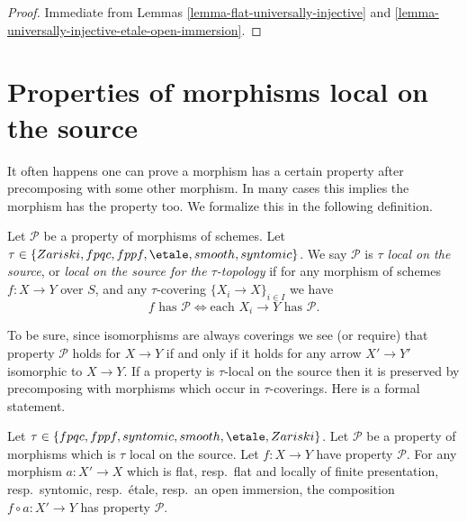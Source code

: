 \begin{proof}
Immediate from Lemmas \ref{lemma-flat-universally-injective} and
\ref{lemma-universally-injective-etale-open-immersion}.
\end{proof}
















\section{Properties of morphisms local on the source}
\label{section-properties-morphisms-local-source}

\noindent
It often happens one can prove a morphism has a certain property
after precomposing with some other morphism. In many cases this
implies the morphism has the property too. We formalize
this in the following definition.

\begin{definition}
\label{definition-property-morphisms-local-source}
Let $\mathcal{P}$ be a property of morphisms of schemes.
Let $\tau \in \{Zariski, \linebreak[0] fpqc, \linebreak[0] fppf, \linebreak[0]
\etale, \linebreak[0] smooth, \linebreak[0] syntomic\}$.
We say $\mathcal{P}$ is
{\it $\tau$ local on the source}, or
{\it local on the source for the $\tau$-topology} if for
any morphism of schemes $f : X \to Y$ over $S$, and any
$\tau$-covering $\{X_i \to X\}_{i \in I}$ we
have
$$
f \text{ has }\mathcal{P}
\Leftrightarrow
\text{each }X_i \to Y\text{ has }\mathcal{P}.
$$
\end{definition}

\noindent
To be sure, since isomorphisms are always coverings
we see (or require) that property $\mathcal{P}$ holds for $X \to Y$
if and only if it holds for any arrow $X' \to Y'$ isomorphic to $X \to Y$.
If a property is $\tau$-local on the source then it is preserved by
precomposing with morphisms which occur in $\tau$-coverings. Here
is a formal statement.

\begin{lemma}
\label{lemma-precompose-property-local-source}
Let $\tau \in \{fpqc, fppf, syntomic, smooth, \etale, Zariski\}$.
Let $\mathcal{P}$ be a property of morphisms which is $\tau$ local
on the source. Let $f : X \to Y$ have property $\mathcal{P}$.
For any morphism $a : X' \to X$ which is
flat, resp.\ flat and locally of finite presentation, resp.\ syntomic,
resp.\ \'etale, resp.\ an open immersion, the composition
$f \circ a : X' \to Y$ has property $\mathcal{P}$.
\end{lemma}

